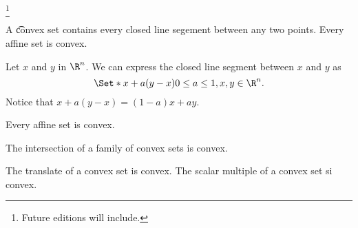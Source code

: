 
  \ifhmode\unskip\fi\footnote{
Future editions will include.
  }


A \t{convex set} contains every closed line segement between any two points.
Every affine set is convex.


Let $x$ and $y$ in $\R^n$. We can express the closed line segment between $x$ and $y$ as
  \[
\Set*{x + a(y - x)}{0 \leq a \leq 1, x, y \in \R^n}.
  \]
Notice that $x + a(y - x) = (1-a)x + ay$.

\begin{prop}
Every affine set is convex.
\end{prop}

\begin{prop}
The intersection of a family of convex sets is convex.
\end{prop}

\begin{prop}
The translate of a convex set is convex.
The scalar multiple of a convex set si convex.
\end{prop}

\blankpage

%
%
%
%
%
%
